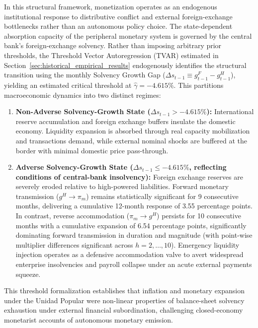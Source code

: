 In this structural framework, monetization operates as an endogenous institutional response to distributive conflict and external foreign-exchange bottlenecks rather than an autonomous policy choice. The state-dependent absorption capacity of the peripheral monetary system is governed by the central bank's foreign-exchange solvency. Rather than imposing arbitrary prior thresholds, the Threshold Vector Autoregression (TVAR) estimated in Section~\ref{sec:historical_empirical_results} endogenously identifies the structural transition using the monthly Solvency Growth Gap ($\Delta s_{t-1} \equiv g^F_{t-1} - g^H_{t-1}$), yielding an estimated critical threshold at $\hat{\gamma} = -4.615\%$. This partitions macroeconomic dynamics into two distinct regimes:
\begin{enumerate}[leftmargin=2em]
	\item \textbf{Non-Adverse Solvency-Growth State ($\Delta s_{t-1} > -4.615\%$):} International reserve accumulation and foreign exchange buffers insulate the domestic economy. Liquidity expansion is absorbed through real capacity mobilization and transactions demand, while external nominal shocks are buffered at the border with minimal domestic price pass-through.
	\item \textbf{Adverse Solvency-Growth State ($\Delta s_{t-1} \le -4.615\%$, reflecting conditions of central-bank insolvency):} Foreign exchange reserves are severely eroded relative to high-powered liabilities. Forward monetary transmission ($g^H \to \pi_m$) remains statistically significant for 9 consecutive months, delivering a cumulative 12-month response of 3.55 percentage points. In contrast, reverse accommodation ($\pi_m \to g^H$) persists for 10 consecutive months with a cumulative expansion of 6.54 percentage points, significantly dominating forward transmission in duration and magnitude (with point-wise multiplier differences significant across $h=2,\dots,10$). Emergency liquidity injection operates as a defensive accommodation valve to avert widespread enterprise insolvencies and payroll collapse under an acute external payments squeeze.
\end{enumerate}
This threshold formalization establishes that inflation and monetary expansion under the Unidad Popular were non-linear properties of balance-sheet solvency exhaustion under external financial subordination, challenging closed-economy monetarist accounts of autonomous monetary emission.

